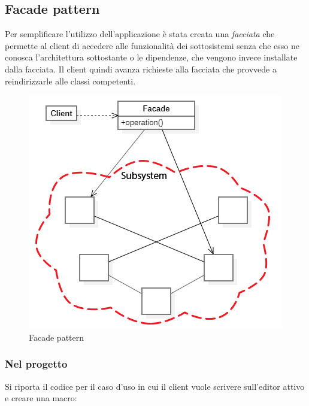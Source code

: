 \documentclass[12pt]{article}
\begin{document}
\subsection{Facade pattern}
Per semplificare l'utilizzo dell'applicazione è stata creata una \emph{facciata} che permette al client di accedere alle funzionalità dei sottosistemi senza che esso ne conosca l'architettura sottostante o le dipendenze, che vengono invece installate dalla facciata.
Il client quindi avanza richieste alla facciata che provvede a reindirizzarle alle classi competenti.
\begin{figure}[h!]
\centering
\includegraphics[scale=0.5]{facadePattern.png}
\caption{Facade pattern}
\label{fig:facadePattern}
\end{figure}

\subsubsection{Nel progetto}
Si riporta il codice per il caso d'uso in cui il client vuole scrivere sull'editor attivo e creare una macro:\\
\begin{minipage}{\textwidth}

\end{minipage}
\begin{minipage}{\textwidth}

\end{minipage}
\end{document}
